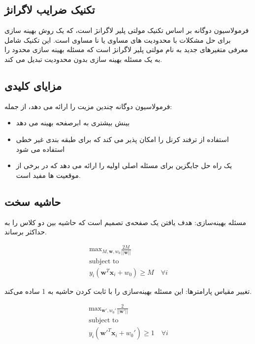 \documentclass[12pt]{article}
\begin{document}
\subsection{
تکنیک ضرایب لاگرانژ
}
فرمولاسیون دوگانه بر اساس تکنیک مولتی پلیر لاگرانژ است، که یک روش بهینه سازی برای حل مشکلات با محدودیت های مساوی یا نا مساوی است. این تکنیک شامل معرفی متغیرهای جدید به نام مولتی پلیر لاگرانژ است که مسئله بهینه سازی محدود را به یک مسئله بهینه سازی بدون محدودیت تبدیل می کند.
\subsection{مزایای کلیدی}

فرمولاسیون دوگانه 
چندین مزیت را ارائه می دهد، از جمله:
\begin{itemize}
\singlespace
    \item بینش بیشتری به ابرصفحه بهینه می دهد
    \item 
استفاده از ترفند کرنل را امکان پذیر می کند که برای طبقه بندی غیر خطی استفاده می شود
    \item
یک راه حل جایگزین برای مسئله اصلی اولیه را ارائه می دهد که در برخی از موقعیت ها مفید است.

\end{itemize}

\subsection*{حاشیه سخت}
مسئله بهینه‌سازی: هدف یافتن یک صفحه‌ی تصمیم است که حاشیه بین دو کلاس را به حداکثر برساند.
\begin{latin}
    
\begin{align*}
  \text{max}_{M,\mathbf{w},w_0} \frac{2M}{||\mathbf{w}||} \\
  \text{subject to} \\
  y_i (\mathbf{w}^T \mathbf{x}_i + w_0) \geq M \quad \forall i
\end{align*}
\end{latin}
تغییر مقیاس پارامترها: این مسئله بهینه‌سازی را با ثابت کردن حاشیه به 1 ساده می‌کند.
\begin{latin}
    \begin{align*}
  \text{max}_{\mathbf{w}',w_0'} \frac{2}{||\mathbf{w}'||} \\
  \text{subject to} \\
  y_i (\mathbf{w}'^T \mathbf{x}_i + w_0') \geq 1 \quad \forall i
\end{align*}
\end{latin}
\end{document}
